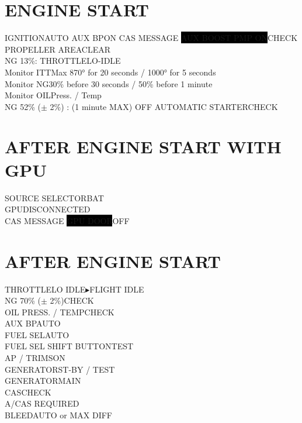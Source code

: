 \documentclass{article}
\begin{document}
\begin{multicols*}{2}
\section*{ENGINE START}
IGNITION\dotfill AUTO
AUX BP\dotfill ON
CAS MESSAGE \colorbox{Black}{\color{Orange}AUX BOOST PMP ON}\dotfill CHECK\\
PROPELLER AREA\dotfill CLEAR\\
NG 13\%: THROTTLE\dotfill LO-IDLE\\
\hspace*{6mm} Monitor ITT\quad\color{Orange}Max 870° for 20 seconds / 1000° for 5 seconds\color{Black}\\
\hspace*{6mm} Monitor NG\quad\color{Orange}30\% before 30 seconds / 50\% before 1 minute\color{Black}\\
\hspace*{6mm} Monitor OIL\quad Press. / Temp\\
NG 52\% ($\pm$ 2\%) : (1 minute MAX)
\hspace{6mm}OFF AUTOMATIC STARTER\dotfill CHECK
\section*{AFTER ENGINE START WITH GPU}
SOURCE SELECTOR\dotfill BAT\\
GPU\dotfill DISCONNECTED\\
CAS MESSAGE \colorbox{Black}{\color{Orange}GPU DOOR}\dotfill OFF
\section*{AFTER ENGINE START}
THROTTLE\dotfill LO IDLE$\blacktriangleright$FLIGHT IDLE\\
NG 70\% ($\pm$ 2\%)\dotfill CHECK\\
OIL PRESS. / TEMP\dotfill CHECK\\
AUX BP\dotfill AUTO\\
FUEL SEL\dotfill AUTO\\
FUEL SEL SHIFT BUTTON\dotfill TEST\\
AP / TRIMS\dotfill ON\\
GENERATOR\dotfill ST-BY / TEST\\
GENERATOR\dotfill MAIN\\
CAS\dotfill CHECK\\
A/C\dotfill AS REQUIRED\\
BLEED\dotfill AUTO or MAX DIFF
\vfill\null

\end{multicols*}
\end{document}
